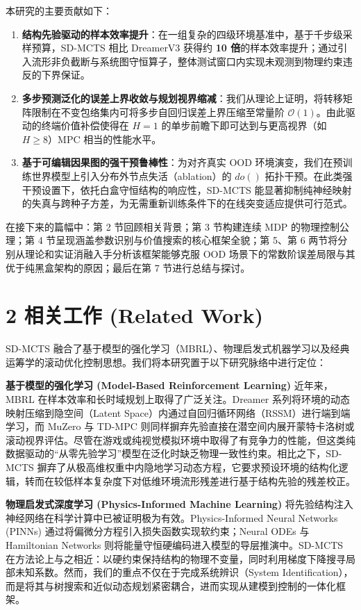 \documentclass[UTF8]{ctexart}
\begin{document}
本研究的主要贡献如下：

\begin{enumerate}
\item \textbf{结构先验驱动的样本效率提升}：在一组复杂的四级环境基准中，基于千步级采样预算，SD-MCTS 相比 DreamerV3 获得约 \textbf{10 倍}的样本效率提升；通过引入流形非负截断与系统图守恒算子，整体测试窗口内实现未观测到物理约束违反的下界保证。
\item \textbf{多步预测泛化的误差上界收敛与规划视界缩减}：我们从理论上证明，将转移矩阵限制在不变包络集内可将多步自回归误差上界压缩至常量阶 \(\mathcal{O}(1)\)。由此驱动的终端价值补偿使得在 \(H=1\) 的单步前瞻下即可达到与更高视界（如 \(H \ge 8\)）MPC 相当的性能水平。
\item \textbf{基于可编辑因果图的强干预鲁棒性}：为对齐真实 OOD 环境演变，我们在预训练世界模型上引入分布外节点失活（ablation）的 \(do()\) 拓扑干预。在此类强干预设置下，依托白盒守恒结构的响应性，SD-MCTS 能显著抑制纯神经映射的失真与跨种子方差，为无需重新训练条件下的在线突变适应提供可行范式。
\end{enumerate}

在接下来的篇幅中：第 2 节回顾相关背景；第 3 节构建连续 MDP
的物理控制公理；第 4 节呈现涵盖参数识别与价值搜索的核心框架全貌；第
5、第 6 两节将分别从理论和实证消融入手分析该框架能够克服 OOD 场景下的常数阶误差局限与其优于纯黑盒架构的原因；最后在第 7 节进行总结与探讨。

\hypertarget{sec-related-work}{%
\section{2 相关工作 (Related
Work)}\label{sec-related-work}}

SD-MCTS
融合了基于模型的强化学习（MBRL）、物理启发式机器学习以及经典运筹学的滚动优化控制思想。我们将本研究置于以下研究脉络中进行定位：

\textbf{基于模型的强化学习 (Model-Based Reinforcement Learning)}
近年来，MBRL 在样本效率和长时域规划上取得了广泛关注。Dreamer
系列将环境的动态映射压缩到隐空间（Latent
Space）内通过自回归循环网络（RSSM）进行端到端学习，而 MuZero 与 TD-MPC
则同样摒弃先验直接在潜空间内展开蒙特卡洛树或滚动视界评估。尽管在游戏或纯视觉模拟环境中取得了有竞争力的性能，但这类纯数据驱动的“从零先验学习”模型在泛化时缺乏物理一致性约束。相比之下，SD-MCTS
摒弃了从极高维权重中内隐地学习动态方程，它要求预设环境的结构化逻辑，转而在较低样本复杂度下对低维环境流形残差进行基于结构先验的残差校正。

\textbf{物理启发式深度学习 (Physics-Informed Machine Learning)}
将先验结构注入神经网络在科学计算中已被证明极为有效。Physics-Informed
Neural Networks (PINNs) 通过将偏微分方程引入损失函数实现软约束；Neural
ODEs 与 Hamiltonian Networks
则将能量守恒硬编码进入模型的导层推演中。SD-MCTS
在方法论上与之相近：以硬约束保持结构的物理不变量，同时利用梯度下降搜寻局部未知系数。然而，我们的重点不仅在于完成系统辨识（System
Identification），而是将其与树搜索和近似动态规划紧密耦合，进而实现从建模到控制的一体化框架。
\end{document}

